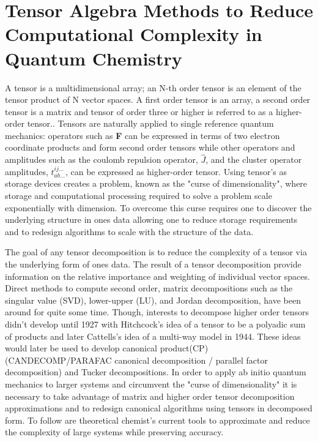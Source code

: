 \section{Tensor Algebra Methods to Reduce Computational Complexity in Quantum Chemistry}
	A tensor is a multidimensional array; an N-th order tensor is an element of the tensor product of N vector spaces.
	A first order tensor is an array, a second order tensor is a matrix and tensor of order three or higher is referred to as a higher-order tensor.\cite{Kolda2008}. Tensors are naturally applied to single reference quantum mechanics: operators such as \textbf{F} can be expressed in terms of two electron coordinate products and form second order tensors while other operators and amplitudes such as the coulomb repulsion operator, $\hat{J}$, and the cluster operator amplitudes, $t^{ij\dots}_{ab\dots}$, can be expressed as higher-order tensor. Using tensor's as storage devices creates a problem, known as the "curse of dimensionality", where storage and computational processing required to solve a problem scale exponentially with dimension.
	To overcome this curse requires one to discover the underlying structure in ones data allowing one to reduce storage requirements and to redesign algorithms to scale with the structure of the data.

	The goal of any tensor decomposition is to reduce the complexity of a tensor via the underlying form of ones data. The result of a tensor decomposition provide information on the relative importance and weighting of individual vector spaces. Direct methods to compute second order, matrix decompositions such as the singular value (SVD), lower-upper (LU), and Jordan decomposition, have been around for quite some time. Though, interests to decompose higher order tensors didn't develop until 1927 with Hitchcock's idea of a tensor to be a polyadic sum of products\cite{Hitchcock1928,Hitchcock1927} and later Cattells's idea of a multi-way model in 1944\cite{Cattell1944,Cattell1952}. These ideas would later be used to develop canonical product(CP) (CANDECOMP/PARAFAC canonical decomposition / parallel factor decomposition) \cite{Carroll1970,Harshman1970} and Tucker decompositions\cite{Tucker1966}. In order to apply ab initio quantum mechanics to larger systems and circumvent the "curse of dimensionality" it is necessary to take advantage of matrix and higher order tensor decomposition approximations and to redesign canonical algorithms using tensors in decomposed form. To follow are theoretical chemist's current tools to approximate and reduce the complexity of large systems while preserving accuracy.
